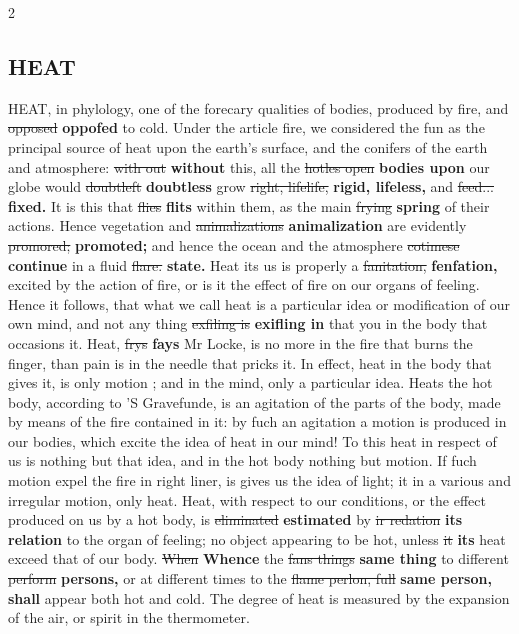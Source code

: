 \documentclass[10pt]{article}
\begin{document}
\begin{multicols}{2}
\subsection*{HEAT}
HEAT, in phylology, one of the forecary qualities of bodies, produced by fire, and \sout{opposed} \textbf{oppofed} to cold. Under the article fire, we considered the fun as the principal source of heat upon the earth's surface, and the conifers of the earth and atmosphere: \sout{with out} \textbf{without} this, all the \sout{hotles open} \textbf{bodies upon} our globe would \sout{doubtleft} \textbf{doubtless} grow \sout{right, lifelife,} \textbf{rigid, lifeless,} and \sout{feed...} \textbf{fixed.} It is this that \sout{flies} \textbf{flits} within them, as the main \sout{frying} \textbf{spring} of their actions. Hence vegetation and \sout{animalizations} \textbf{animalization} are evidently \sout{promored;} \textbf{promoted;} and hence the ocean and the atmosphere \sout{cotimese} \textbf{continue} in a fluid \sout{flare.} \textbf{state.} Heat its us is properly a \sout{fanitation,} \textbf{fenfation,} excited by the action of fire, or is it the effect of fire on our organs of feeling. Hence it follows, that what we call heat is a particular idea or modification of our own mind, and not any thing \sout{exfiling is} \textbf{exifling in} that you in the body that occasions it. Heat, \sout{frys} \textbf{fays} Mr Locke, is no more in the fire that burns the finger, than pain is in the needle that pricks it. In effect, heat in the body that gives it, is only motion ; and in the mind, only a particular idea. Heats the hot body, according to 'S Gravefunde, is an agitation of the parts of the body, made by means of the fire contained in it: by fuch an agitation a motion is produced in our bodies, which excite the idea of heat in our mind! To this heat in respect of us is nothing but that idea, and in the hot body nothing but motion. If fuch motion expel the fire in right liner, is gives us the idea of light; it in a various and irregular motion, only heat. Heat, with respect to our conditions, or the effect produced on us by a hot body, is \sout{eliminated} \textbf{estimated} by \sout{ir redation} \textbf{its relation} to the organ of feeling; no object appearing to be hot, unless \sout{it} \textbf{its} heat exceed that of our body. \sout{When} \textbf{Whence} the \sout{fans things} \textbf{same thing} to different \sout{perform} \textbf{persons,} or at different times to the \sout{flame perlon, full} \textbf{same person, shall} appear both hot and cold. The degree of heat is measured by the expansion of the air, or spirit in the thermometer.
\end{multicols}
\end{document}
